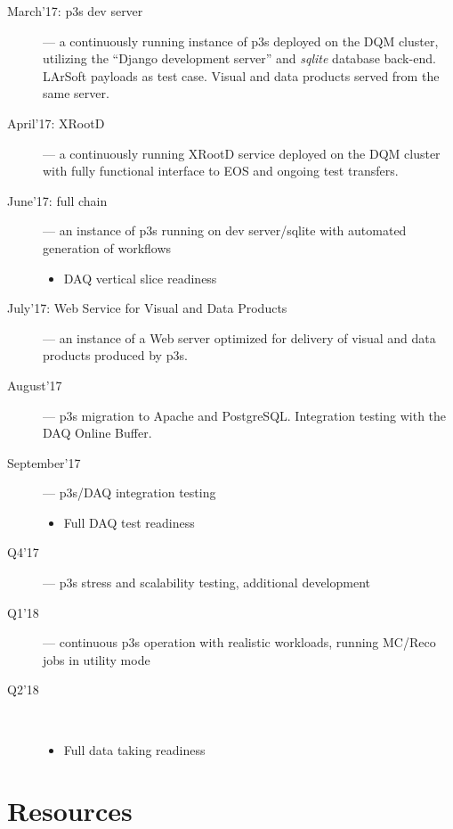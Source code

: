 \documentclass[pdftex,12pt,letter]{article}
\begin{document}
\begin{description}

\item[March'17: p3s dev server] --- a continuously running instance of p3s deployed on the DQM cluster,
utilizing the ``Django development server'' and \textit{sqlite} database back-end. LArSoft payloads as
test case. Visual and data products served from the same server.

\item[April'17: XRootD] --- a continuously running XRootD service deployed on the DQM cluster with
fully functional interface to EOS and ongoing test transfers.

\item[June'17: full chain] --- an instance of p3s running on dev server/sqlite with automated
generation of workflows
\begin{itemize}
\item DAQ vertical slice readiness
\end{itemize}

\item[July'17: Web Service for Visual and Data Products] --- an instance of a Web server optimized
for delivery of visual and data products produced by p3s.

\item[August'17] --- p3s migration to Apache and PostgreSQL. Integration testing with the
DAQ Online Buffer.

\item[September'17] --- p3s/DAQ integration testing
\begin{itemize}
\item Full DAQ test readiness
\end{itemize}

\item[Q4'17] --- p3s stress and scalability testing, additional development

\item[Q1'18] --- continuous p3s operation with realistic workloads, running
MC/Reco jobs in utility mode

\item[Q2'18]\ 
\begin{itemize}
\item Full data taking readiness
\end{itemize}

\end{description}


\section{Resources}
\label{sec:resources}
\end{document}
